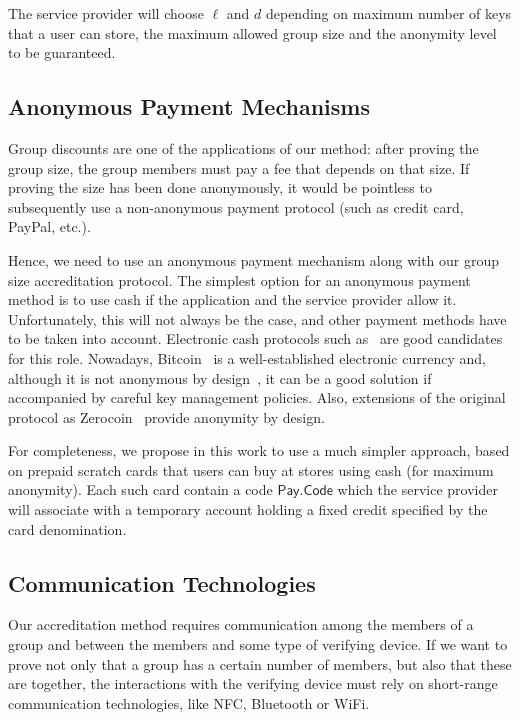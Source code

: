 \documentclass[11pt]{llncs}
\begin{document}
The service provider will choose $\ell$ and $d$
depending on maximum number of keys that a user can store,
the maximum allowed group size and the anonymity level
to be guaranteed.


\subsection{Anonymous Payment Mechanisms}\label{ab.subsec.payment}

Group discounts are one of the applications of our method:
after proving the group size, the group
members must pay a fee that depends on that
size. If proving the size has been done anonymously,
it would be pointless to subsequently use a
non-anonymous payment protocol (such as credit card, PayPal, etc.).

Hence, we need to use an anonymous
payment mechanism along with our group size accreditation
protocol.
The simplest option for an anonymous payment method
is to use cash if the application and the service provider
allow it. Unfortunately, this will not always be the case,
and other payment methods have to be taken into account.
Electronic cash protocols such as~\cite{ab.Chaum1990}
are good candidates for this role.
Nowadays, Bitcoin~\cite{ab.Nakamoto2008}
is a well-established electronic currency and, although
it is not anonymous by design~\cite{ab.Reid2013},
it can be a good solution if accompanied by careful
key management policies.
Also, extensions of the original protocol as
Zerocoin~\cite{ab.Miers2013} provide
anonymity by design.

For completeness, we propose in this work to use a much 
simpler approach, based on prepaid scratch cards that users 
can buy at stores using cash (for maximum anonymity). 
Each such card contain a code $\mathsf{Pay.Code}$
which the service provider will associate with
a temporary account holding a fixed credit specified
by the card denomination. 


\subsection{Communication Technologies}\label{ab.subsec.comm}

Our accreditation method requires communication among
the members of a group and between the members and
some type of verifying device.
If we want to prove not only that a group has a
certain number of members, but also that these are
together, the interactions
with the verifying device must rely on
short-range communication technologies, like
NFC, Bluetooth or WiFi.
\end{document}
